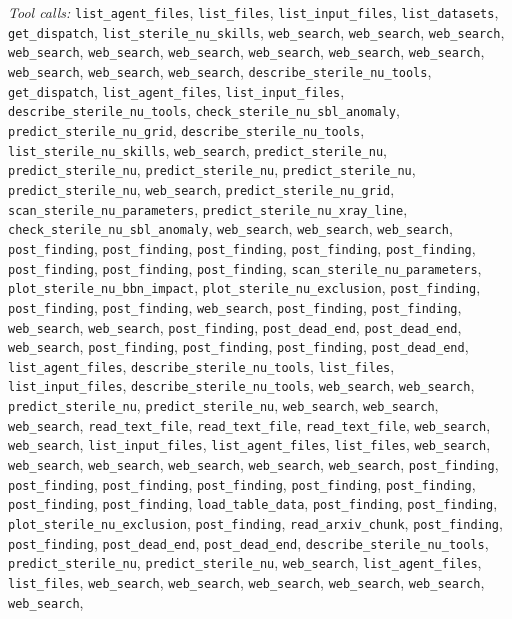 \documentclass[11pt,a4paper]{article}
\begin{document}
\textit{Tool calls:} \texttt{list\_agent\_files}, \texttt{list\_files}, \texttt{list\_input\_files}, \texttt{list\_datasets}, \texttt{get\_dispatch}, \texttt{list\_sterile\_nu\_skills}, \texttt{web\_search}, \texttt{web\_search}, \texttt{web\_search}, \texttt{web\_search}, \texttt{web\_search}, \texttt{web\_search}, \texttt{web\_search}, \texttt{web\_search}, \texttt{web\_search}, \texttt{web\_search}, \texttt{web\_search}, \texttt{web\_search}, \texttt{describe\_sterile\_nu\_tools}, \texttt{get\_dispatch}, \texttt{list\_agent\_files}, \texttt{list\_input\_files}, \texttt{describe\_sterile\_nu\_tools}, \texttt{check\_sterile\_nu\_sbl\_anomaly}, \texttt{predict\_sterile\_nu\_grid}, \texttt{describe\_sterile\_nu\_tools}, \texttt{list\_sterile\_nu\_skills}, \texttt{web\_search}, \texttt{predict\_sterile\_nu}, \texttt{predict\_sterile\_nu}, \texttt{predict\_sterile\_nu}, \texttt{predict\_sterile\_nu}, \texttt{predict\_sterile\_nu}, \texttt{web\_search}, \texttt{predict\_sterile\_nu\_grid}, \texttt{scan\_sterile\_nu\_parameters}, \texttt{predict\_sterile\_nu\_xray\_line}, \texttt{check\_sterile\_nu\_sbl\_anomaly}, \texttt{web\_search}, \texttt{web\_search}, \texttt{web\_search}, \texttt{post\_finding}, \texttt{post\_finding}, \texttt{post\_finding}, \texttt{post\_finding}, \texttt{post\_finding}, \texttt{post\_finding}, \texttt{post\_finding}, \texttt{post\_finding}, \texttt{scan\_sterile\_nu\_parameters}, \texttt{plot\_sterile\_nu\_bbn\_impact}, \texttt{plot\_sterile\_nu\_exclusion}, \texttt{post\_finding}, \texttt{post\_finding}, \texttt{post\_finding}, \texttt{web\_search}, \texttt{post\_finding}, \texttt{post\_finding}, \texttt{web\_search}, \texttt{web\_search}, \texttt{post\_finding}, \texttt{post\_dead\_end}, \texttt{post\_dead\_end}, \texttt{web\_search}, \texttt{post\_finding}, \texttt{post\_finding}, \texttt{post\_finding}, \texttt{post\_dead\_end}, \texttt{list\_agent\_files}, \texttt{describe\_sterile\_nu\_tools}, \texttt{list\_files}, \texttt{list\_input\_files}, \texttt{describe\_sterile\_nu\_tools}, \texttt{web\_search}, \texttt{web\_search}, \texttt{predict\_sterile\_nu}, \texttt{predict\_sterile\_nu}, \texttt{web\_search}, \texttt{web\_search}, \texttt{web\_search}, \texttt{read\_text\_file}, \texttt{read\_text\_file}, \texttt{read\_text\_file}, \texttt{web\_search}, \texttt{web\_search}, \texttt{list\_input\_files}, \texttt{list\_agent\_files}, \texttt{list\_files}, \texttt{web\_search}, \texttt{web\_search}, \texttt{web\_search}, \texttt{web\_search}, \texttt{web\_search}, \texttt{web\_search}, \texttt{post\_finding}, \texttt{post\_finding}, \texttt{post\_finding}, \texttt{post\_finding}, \texttt{post\_finding}, \texttt{post\_finding}, \texttt{post\_finding}, \texttt{post\_finding}, \texttt{load\_table\_data}, \texttt{post\_finding}, \texttt{post\_finding}, \texttt{plot\_sterile\_nu\_exclusion}, \texttt{post\_finding}, \texttt{read\_arxiv\_chunk}, \texttt{post\_finding}, \texttt{post\_finding}, \texttt{post\_dead\_end}, \texttt{post\_dead\_end}, \texttt{describe\_sterile\_nu\_tools}, \texttt{predict\_sterile\_nu}, \texttt{predict\_sterile\_nu}, \texttt{web\_search}, \texttt{list\_agent\_files}, \texttt{list\_files}, \texttt{web\_search}, \texttt{web\_search}, \texttt{web\_search}, \texttt{web\_search}, \texttt{web\_search}, \texttt{web\_search}, 
\end{document}
